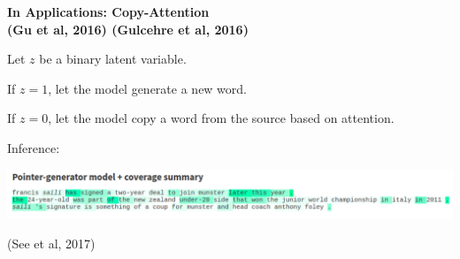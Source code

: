 \documentclass[aspectratio=169,12pt]{beamer}
\let\tempone\itemize
\let\temptwo\enditemize
\renewenvironment{itemize}{\tempone\addtolength{\itemsep}{0.5\baselineskip}}{\temptwo}
\newcommand{\air}{\vspace{0.25cm}}
\begin{document}
\begin{frame}
  \begin{center}
    \textbf{ In Applications: Copy-Attention \\
      \small{(Gu et al, 2016) (Gulcehre et al, 2016)}}
  \end{center}

Let $z$ be a binary latent variable.
\air
\begin{itemize}
\item If $z = 1$, let the model generate a new word.
\item If $z = 0$, let the model copy a word from the source based on attention.
\end{itemize}

Inference:
\begin{center}


\includegraphics[width=15cm]{seeblog}

\centerline{\small (See et al, 2017)}
\end{center}
\end{frame}




\end{document}
